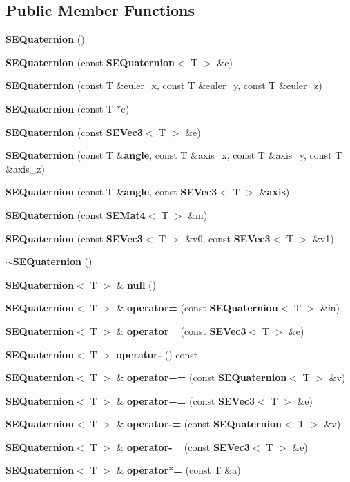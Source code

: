 \subsection*{Public Member Functions}
\begin{DoxyCompactItemize}
\item 
{\bf S\+E\+Quaternion} ()
\item 
{\bf S\+E\+Quaternion} (const {\bf S\+E\+Quaternion}$<$ T $>$ \&c)
\item 
{\bf S\+E\+Quaternion} (const T \&euler\+\_\+x, const T \&euler\+\_\+y, const T \&euler\+\_\+z)
\item 
{\bf S\+E\+Quaternion} (const T $\ast$e)
\item 
{\bf S\+E\+Quaternion} (const {\bf S\+E\+Vec3}$<$ T $>$ \&e)
\item 
{\bf S\+E\+Quaternion} (const T \&{\bf angle}, const T \&axis\+\_\+x, const T \&axis\+\_\+y, const T \&axis\+\_\+z)
\item 
{\bf S\+E\+Quaternion} (const T \&{\bf angle}, const {\bf S\+E\+Vec3}$<$ T $>$ \&{\bf axis})
\item 
{\bf S\+E\+Quaternion} (const {\bf S\+E\+Mat4}$<$ T $>$ \&m)
\item 
{\bf S\+E\+Quaternion} (const {\bf S\+E\+Vec3}$<$ T $>$ \&v0, const {\bf S\+E\+Vec3}$<$ T $>$ \&v1)
\item 
{\bf $\sim$\+S\+E\+Quaternion} ()
\item 
{\bf S\+E\+Quaternion}$<$ T $>$ \& {\bf null} ()
\item 
{\bf S\+E\+Quaternion}$<$ T $>$ \& {\bf operator=} (const {\bf S\+E\+Quaternion}$<$ T $>$ \&in)
\item 
{\bf S\+E\+Quaternion}$<$ T $>$ \& {\bf operator=} (const {\bf S\+E\+Vec3}$<$ T $>$ \&e)
\item 
{\bf S\+E\+Quaternion}$<$ T $>$ {\bf operator-\/} () const 
\item 
{\bf S\+E\+Quaternion}$<$ T $>$ \& {\bf operator+=} (const {\bf S\+E\+Quaternion}$<$ T $>$ \&v)
\item 
{\bf S\+E\+Quaternion}$<$ T $>$ \& {\bf operator+=} (const {\bf S\+E\+Vec3}$<$ T $>$ \&e)
\item 
{\bf S\+E\+Quaternion}$<$ T $>$ \& {\bf operator-\/=} (const {\bf S\+E\+Quaternion}$<$ T $>$ \&v)
\item 
{\bf S\+E\+Quaternion}$<$ T $>$ \& {\bf operator-\/=} (const {\bf S\+E\+Vec3}$<$ T $>$ \&e)
\item 
{\bf S\+E\+Quaternion}$<$ T $>$ \& {\bf operator$\ast$=} (const T \&a)
\item 

\end{DoxyCompactItemize}
